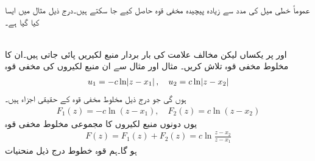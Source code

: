 عموماً خطی میل کی مدد سے زیادہ پیچیدہ مخفی قوہ حاصل کیے جا سکتے ہیں۔درج ذیل مثال میں ایسا کیا گیا ہے۔

\quad {}\\
 اور  پر یکساں لیکن مخالف علامت کی بار بردار منبع لکیریں پائی جاتی ہیں۔ان کا مخلوط مخفی قوہ تلاش کریں۔ مثال  اور مثال  سے ان منبع لکیروں کی مخفی قوہ
\begin{align*}
u_1=-c\ln\abs{z-x_1},\quad u_2=c\ln\abs{z-x_2}
\end{align*}
ہوں گی جو درج ذیل مخلوط مخفی قوہ کے حقیقی اجزاء ہیں۔
\begin{align*}
F_1(z)=-c\ln(z-x_1),\quad F_2(z)=c\ln(z-x_2)
\end{align*} 
یوں دونوں منبع لکیروں کا مجموعی مخلوط مخفی قوہ  
\begin{align}\label{مساوات_مخفی_قوہ_مثال_مخفی_قوہ_جوڑی_دار}
F(z)=F_1(z)+F_2(z)=c\ln\frac{z-x_2}{z-x_1}
\end{align}
ہو گا۔ہم قوہ خطوط درج ذیل منحنیات

